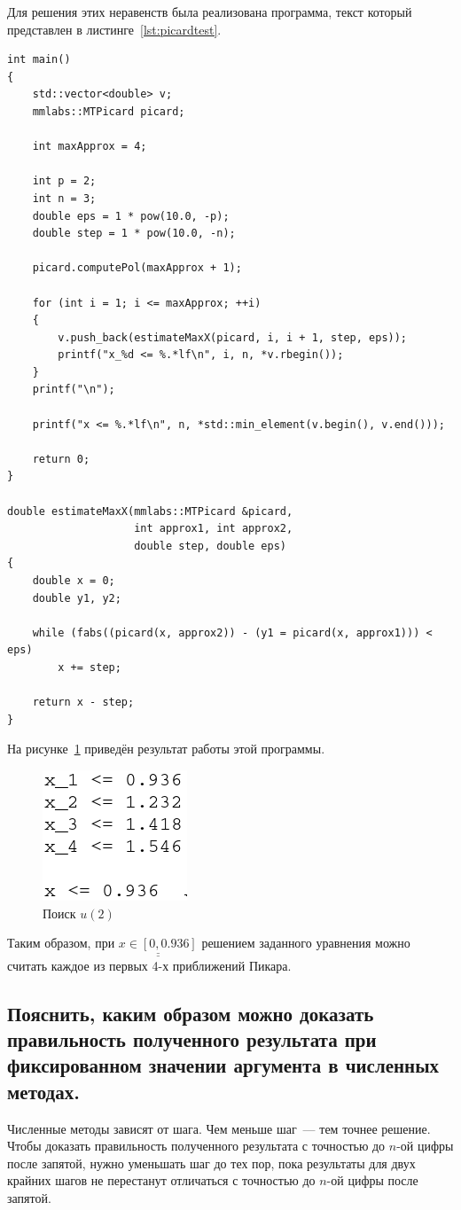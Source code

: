 Для решения этих неравенств была реализована программа, текст который представлен в листинге~\ref{lst:picardtest}.
\begin{lstlisting}[caption={Поиск интервалов},label={lst:picardtest}]
int main()
{
    std::vector<double> v;
    mmlabs::MTPicard picard;

    int maxApprox = 4;

    int p = 2;
    int n = 3;
    double eps = 1 * pow(10.0, -p);
    double step = 1 * pow(10.0, -n);

    picard.computePol(maxApprox + 1);

    for (int i = 1; i <= maxApprox; ++i)
    {
        v.push_back(estimateMaxX(picard, i, i + 1, step, eps));
        printf("x_%d <= %.*lf\n", i, n, *v.rbegin());
    }
    printf("\n");

    printf("x <= %.*lf\n", n, *std::min_element(v.begin(), v.end()));

    return 0;
}

double estimateMaxX(mmlabs::MTPicard &picard,
                    int approx1, int approx2,
                    double step, double eps)
{
    double x = 0;
    double y1, y2;

    while (fabs((picard(x, approx2)) - (y1 = picard(x, approx1))) < eps)
        x += step;

    return x - step;
}
\end{lstlisting}

На рисунке~\ref{img:answer1} приведён результат работы этой программы.
\begin{figure}[H]
    \centering
    \caption{Поиск $u(2)$}\label{img:answer1}
    \includegraphics[scale=0.5]{images/picard_test.png}
\end{figure}

Таким образом, при $\underline{\underline{x \in [0, 0.936]}}$ решением заданного уравнения можно считать каждое из первых 4-х приближений Пикара.

\subsection{Пояснить, каким образом можно доказать правильность полученного результата при фиксированном значении аргумента в численных методах.}\label{ans2}
Численные методы зависят от шага. Чем меньше шаг~--- тем точнее решение. Чтобы доказать правильность полученного результата с точностью до $n$-ой цифры после запятой, нужно уменьшать шаг до тех пор, пока результаты для двух крайних шагов не перестанут отличаться с точностью до $n$-ой цифры после запятой.

